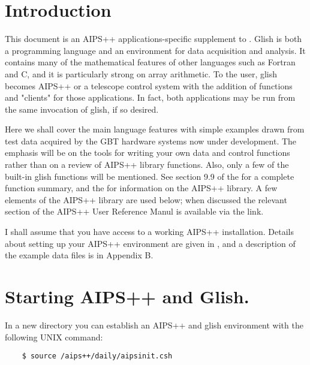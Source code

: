 

\section{Introduction} 

This document is an AIPS++ applications-specific supplement to
.  Glish is both a
programming language and an environment for data acquisition and
analysis.  It contains many of the mathematical features of other
languages such as Fortran and C, and it is particularly strong on
array arithmetic.  To the user, glish becomes AIPS++ or a telescope
control system with the addition of functions and "clients" for those
applications.  In fact, both applications may be run from the same
invocation of glish, if so desired.

Here we shall cover the main language features with simple examples
drawn from test data acquired by the GBT hardware systems now under
development.  The emphasis will be on the tools for writing your own
data and control functions rather than on a review of AIPS++ library
functions.  Also, only a few of the built-in glish functions will be
mentioned.  See section 9.9 of the
 for a
complete function summary, and the  for information on the
AIPS++ library. A few elements of the AIPS++ library are used
below; when discussed the relevant section of the AIPS++ User
Reference Manul is available via the link.

I shall assume that you have access to a working AIPS++ installation.
Details about setting up your AIPS++ environment are given in 
, 
and a description of the example data files is in Appendix B.

\section{Starting AIPS++ and Glish.}

    In a new directory you can establish an AIPS++ and glish environment
with the following UNIX command:

\begin{verbatim}
	$ source /aips++/daily/aipsinit.csh
\end{verbatim}

